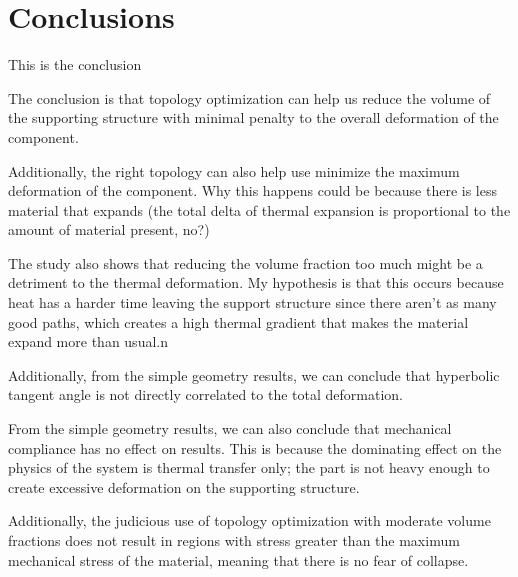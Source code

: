 \documentclass[../main.tex]{subfiles}
\begin{document}
\chapter{Conclusions}

This is the conclusion

The conclusion is that topology optimization can help us reduce the volume of the supporting structure with minimal penalty to the overall deformation of the component. 


Additionally, the right topology can also help use minimize the maximum deformation of the component. Why this happens could be because there is less material that expands (the total delta of thermal expansion is proportional to the amount of material present, no?)


The study also shows that reducing the volume fraction too much might be a detriment to the thermal deformation. My hypothesis is that this occurs because heat has a harder time leaving the support structure since there aren’t as many good paths, which creates a high thermal gradient that makes the material expand more than usual.n

Additionally, from the simple geometry results, we can conclude that hyperbolic tangent angle is not directly correlated to the total deformation.


From the simple geometry results, we can also conclude that mechanical compliance has no effect on results. This is because the dominating effect on the physics of the system is thermal transfer only; the part is not heavy enough to create excessive deformation on the supporting structure.


Additionally, the judicious use of topology optimization with moderate volume fractions does not result in regions with stress greater than the maximum mechanical stress of the material, meaning that there is no fear of collapse.
\end{document}
